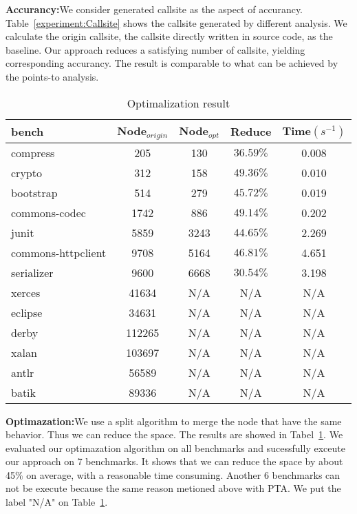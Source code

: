 \documentclass{llncs}
\begin{document}
\textbf{Accurancy:}We consider generated callsite as the aspect of accurancy. Table~\ref{experiment:Callsite} shows the callsite generated by different analysis. We calculate the origin callsite, the callsite directly written in source code, as the baseline. Our approach reduces a satisfying number of callsite, yielding corresponding accurancy. The result is comparable to what can be achieved by the points-to analysis.

\begin{table}[!htbp]\centering
\caption{Optimalization result}
\begin{tabular}{lcccc}
	\hline
	\textbf{bench} & \textbf{Node$_{origin}$} & \textbf{Node$_{opt}$} & \textbf{Reduce} & \textbf{Time$(s^{-1})$} \\
	\hline
	compress & 205 & 130 & $36.59\%$ & 0.008 \\
	crypto & 312 & 158 & $49.36\%$ & 0.010 \\
	bootstrap & 514 & 279 & $45.72\%$ & 0.019 \\
	commons-codec & 1742 & 886 & $49.14\%$ & 0.202 \\
	junit & 5859 & 3243 & $44.65\%$ & 2.269 \\
	commons-httpclient & 9708 & 5164 & $46.81\%$ & 4.651 \\
	serializer & 9600 & 6668 & $30.54\%$ & 3.198 \\
	xerces & 41634 & N/A & N/A & N/A\\
	eclipse & 34631 & N/A & N/A & N/A\\
	derby & 112265 & N/A & N/A & N/A\\
	xalan & 103697 & N/A & N/A & N/A\\
	antlr & 56589 & N/A & N/A & N/A\\
	batik & 89336 & N/A & N/A & N/A\\
	\hline
\end{tabular}
\label{experiment:Optimalization}
\end{table}

\textbf{Optimazation:}We use a split algorithm to merge the node that have the same behavior. Thus we can reduce the space. The results are showed in Tabel~\ref{experiment:Optimalization}. We evaluated our optimazation algorithm on all benchmarks and sucessfully exceute our approach on 7 benchmarks. It shows that we can reduce the space by about 45$\%$ on average, with a reasonable time consuming. Another 6 benchmarks can not be execute because the same reason metioned above with PTA. We put the label "N/A" on Table~\ref{experiment:Optimalization}.  
\end{document}
